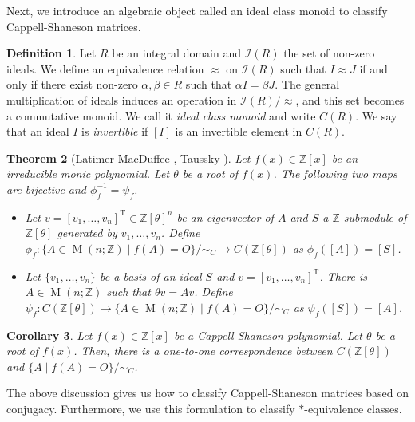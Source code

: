 \documentclass[12pt]{amsart}
\theoremstyle{plain}
\newtheorem{theorem}{Theorem}[section]
\newtheorem{corollary}[theorem]{Corollary}
\theoremstyle{definition}
\newtheorem{definition}[theorem]{Definition}
\theoremstyle{remark}
\renewcommand{\(}{\big(}
\renewcommand{\)}{\big)}
\theoremstyle{plain}
\theoremstyle{definition}
\begin{document}
    Next, we introduce an algebraic object called an ideal class monoid to classify Cappell-Shaneson matrices.

    \begin{definition}
    Let $R$ be an integral domain and $\mathcal{I}(R)$ the set of non-zero ideals. We define an equivalence relation $\approx$ on $\mathcal{I}(R)$ such that $I \approx J$ if and only if there exist non-zero $\alpha,\beta \in R$ such that $\alpha I = \beta J$. The general multiplication of ideals induces an operation in $\mathcal{I}(R)/\approx$, and this set becomes a commutative monoid. We call it \textit{ideal class monoid} and write $C(R)$. We say that an ideal $I$ is \textit{invertible} if $[I]$ is an invertible element in $C(R)$.
    \end{definition}

    \begin{theorem}[Latimer-MacDuffee \cite{Latimer-MacDuffee}, Taussky \cite{Taussky}]\label{theorem:LMT}
     Let $f(x) \in \mathbb{Z}[x]$ be an irreducible monic polynomial. Let $\theta$ be a root of $f(x)$. The following two maps are bijective and $\phi_f^{-1} = \psi_f$.
     \begin{itemize}
         \item Let $v=[v_1, \ldots, v_n]^\mathrm{T}\in\mathbb{Z}[\theta]^n$ be an eigenvector of $A$ and $S$ a $\mathbb{Z}$-submodule of $\mathbb{Z}[\theta]$ generated by $v_1,\ldots,v_n$. Define $\phi_f : \{A \in \operatorname{M}(n;\mathbb{Z})\mid f(A)=O\}/\sim_C \rightarrow C(\mathbb{Z}[\theta])$ as $\phi_f([A])=[S]$.
         \item Let $\{v_1, \ldots, v_n\}$ be a basis of an ideal $S$ and $v=[v_1,\ldots,v_n]^\mathrm{T}$. There is $A\in \operatorname{M}(n;\mathbb{Z})$ such that $\theta v=A v$. Define $\psi_f : C(\mathbb{Z}[\theta]) \rightarrow \{A \in \operatorname{M}(n;\mathbb{Z})\mid f(A)=O\}/\sim_C$ as $\psi_f([S])=[A]$.
     \end{itemize}
    \end{theorem}

    \begin{corollary}
        Let $f(x) \in \mathbb{Z}[x]$ be a Cappell-Shaneson polynomial. Let $\theta$ be a root of $f(x)$. Then, there is a one-to-one correspondence between $C(\mathbb{Z}[\theta])$ and $\{A\mid f(A)=O\}/\sim_C$.
    \end{corollary}

    The above discussion gives us how to classify Cappell-Shaneson matrices based on conjugacy. Furthermore, we use this formulation to classify $*$-equivalence classes.
\end{document}
